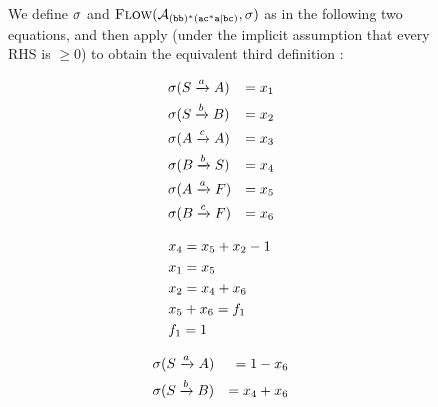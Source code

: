\documentclass[acmsmall,review,anonymous,screen]{acmart}\settopmatter{printfolios=true,printccs=false,printacmref=true}
\theoremstyle{definition}
\begin{document}
\begin{figure}[ht]
  We define $\operatorname{\sigma}$ and $\textsc{Flow}(\mathcal{A}_{\mathtt{(bb)^\ast(ac^\ast{}a|bc)}}{}, \operatorname{\sigma})$ as in the following two
  equations, and then apply \EquationReasoning{} (under the implicit assumption
  that every RHS is $\geq 0$) to obtain the equivalent third definition :
  \begin{minipage}[b]{0.3\linewidth}
    \begin{equation*}
      \begin{aligned}
        & \operatorname{\sigma}(S \xrightarrow{a} A) & = x_1 \\
        & \operatorname{\sigma}(S \xrightarrow{b} B) & = x_2 \\
        & \operatorname{\sigma}(A \xrightarrow{c} A)  & = x_3  \\
        & \operatorname{\sigma}(B \xrightarrow{b} S) & = x_4 \\
        & \operatorname{\sigma}(A \xrightarrow{a} F) & = x_5 \\
        & \operatorname{\sigma}(B \xrightarrow{c} F) & = x_6 \\
      \end{aligned}
    \end{equation*}    
  \end{minipage}
  \hspace{0.5cm}
  \begin{minipage}[b]{0.3\linewidth}
    \begin{equation*}
      \begin{aligned}
        &  x_4 = x_5 + x_2 - 1 \\
        & x_1 = x_5 \\
        & x_2 = x_4 + x_6 \\
        & x_5 + x_6 = f_1 \\
        & f_1 = 1 \\
      \end{aligned}  
    \end{equation*}    
  \end{minipage}
  \begin{minipage}[b]{0.3\linewidth}
    \begin{equation*}
      \begin{aligned}
        & \Filter(\FromLabelTo{S}{a}{A}) & = 1 - \TransitionVar_6 \\
        & \Filter(\FromLabelTo{S}{b}{B}) & = \TransitionVar_4 + \TransitionVar_6 \\

\end{aligned}
\end{equation*}
\end{minipage}
\end{figure}
\end{document}
